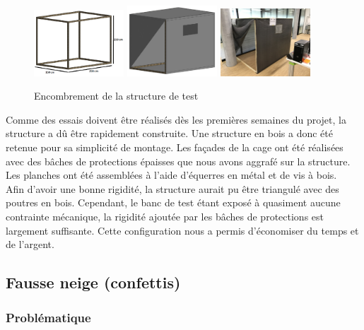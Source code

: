 \begin{figure}[H]
    \centering
    \includegraphics[width=0.3\textwidth]{Images/photos_PGA/P004_CageDeTest21.png}
    \includegraphics[width=0.3\textwidth]{Images/photos_PGA/P004_CageDeTest2.png}
    \includegraphics[width=0.3\textwidth]{Images/photos_PGA/IMG_0442.jpg}
    \caption{Encombrement de la structure de test}
    \label{fig:encombrement}
\end{figure}

Comme des essais doivent être réalisés dès les premières semaines du projet, la structure a dû être
rapidement construite. Une structure en bois a donc été retenue pour sa simplicité de montage. 
Les façades de la cage ont été réalisées avec des bâches de protections épaisses que nous avons aggrafé 
sur la structure. Les planches ont été assemblées à l’aide d’équerres en métal et de vis à bois.\\
Afin d’avoir une bonne rigidité, la structure aurait pu être triangulé avec des poutres en bois. 
Cependant, le banc de test étant exposé à quasiment aucune contrainte mécanique, la rigidité ajoutée par 
les bâches de protections est largement suffisante. Cette configuration nous a permis d’économiser du 
temps et de l’argent.

\subsection{Fausse neige (confettis)}

\subsubsection{Problématique}

